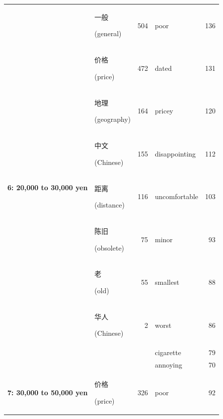 \documentclass[smallextended,natbib]{svjour3}       %
\begin{document}
\begin{table}[ht]
{\begin{tabular}{|c|lr|lr|}
        \multirow{10}{*}{\textbf{6: 20,000 to 30,000 yen}}   & \begin{CJK}{UTF8}{gbsn}一般\end{CJK} (general)   & 504  & poor           & 136 \\  
                                                             & \begin{CJK}{UTF8}{gbsn}价格\end{CJK} (price)     & 472  & dated          & 131 \\  
                                                             & \begin{CJK}{UTF8}{gbsn}地理\end{CJK} (geography) & 164  & pricey         & 120 \\  
                                                             & \begin{CJK}{UTF8}{gbsn}中文\end{CJK} (Chinese)   & 155  & disappointing  & 112 \\  
                                                             & \begin{CJK}{UTF8}{gbsn}距离\end{CJK} (distance)  & 116  & uncomfortable  & 103 \\  
                                                             & \begin{CJK}{UTF8}{gbsn}陈旧\end{CJK} (obsolete)  & 75   & minor          & 93  \\  
                                                             & \begin{CJK}{UTF8}{gbsn}老\end{CJK} (old)        & 55   & smallest       & 88  \\  
                                                             & \begin{CJK}{UTF8}{gbsn}华人\end{CJK} (Chinese)   & 2    & worst          & 86  \\  
                                                             &                                                &      & cigarette      & 79  \\  
                                                             &                                                &      & annoying       & 70  \\ \hline
        \multirow{10}{*}{\textbf{7: 30,000 to 50,000 yen}}   & \begin{CJK}{UTF8}{gbsn}价格\end{CJK} (price)     & 326  & poor           & 92  \\  

\end{tabular}}
\end{table}
\end{document}
